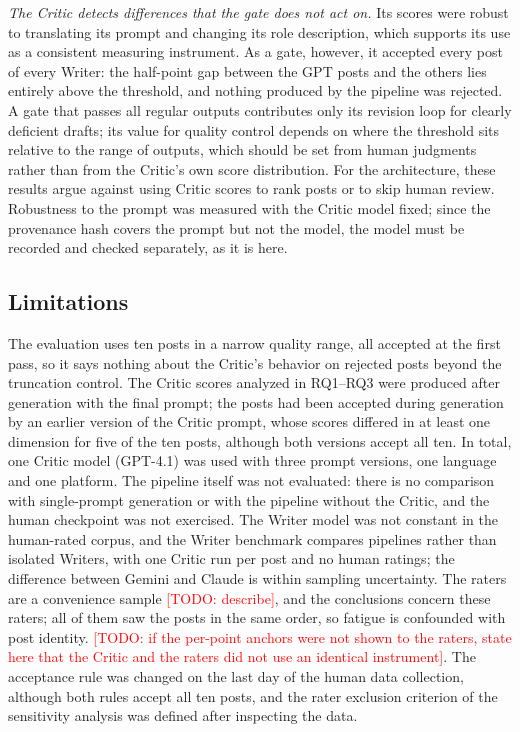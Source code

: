 \documentclass[a4paper,twoside]{article}
\newcommand{\TODO}[1]{\textcolor{red}{[TODO: #1]}}
\begin{document}
\emph{The Critic detects differences that the gate does not act on.} Its scores were robust to translating its prompt and changing its role description, which supports its use as a consistent measuring instrument. As a gate, however, it accepted every post of every Writer: the half-point gap between the GPT posts and the others lies entirely above the threshold, and nothing produced by the pipeline was rejected. A gate that passes all regular outputs contributes only its revision loop for clearly deficient drafts; its value for quality control depends on where the threshold sits relative to the range of outputs, which should be set from human judgments rather than from the Critic's own score distribution. For the architecture, these results argue against using Critic scores to rank posts or to skip human review. Robustness to the prompt was measured with the Critic model fixed; since the provenance hash covers the prompt but not the model, the model must be recorded and checked separately, as it is here.

\subsection{Limitations}
\label{sec:limitations}

The evaluation uses ten posts in a narrow quality range, all accepted at the first pass, so it says nothing about the Critic's behavior on rejected posts beyond the truncation control. The Critic scores analyzed in RQ1--RQ3 were produced after generation with the final prompt; the posts had been accepted during generation by an earlier version of the Critic prompt, whose scores differed in at least one dimension for five of the ten posts, although both versions accept all ten. In total, one Critic model (GPT-4.1) was used with three prompt versions, one language and one platform. The pipeline itself was not evaluated: there is no comparison with single-prompt generation or with the pipeline without the Critic, and the human checkpoint was not exercised. The Writer model was not constant in the human-rated corpus, and the Writer benchmark compares pipelines rather than isolated Writers, with one Critic run per post and no human ratings; the difference between Gemini and Claude is within sampling uncertainty. The raters are a convenience sample \TODO{describe}, and the conclusions concern these raters; all of them saw the posts in the same order, so fatigue is confounded with post identity. \TODO{if the per-point anchors were not shown to the raters, state here that the Critic and the raters did not use an identical instrument}. The acceptance rule was changed on the last day of the human data collection, although both rules accept all ten posts, and the rater exclusion criterion of the sensitivity analysis was defined after inspecting the data.
\end{document}
